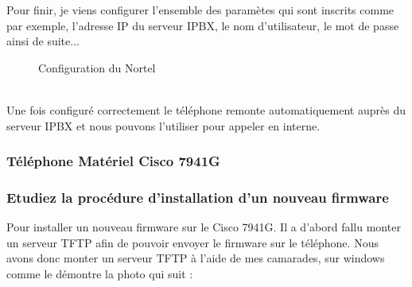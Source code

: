 \documentclass[12pt, a4paper]{article}
\begin{document}
	Pour finir, je viens configurer l'ensemble des paramètes qui sont inscrits
	comme par exemple, l'adresse IP du serveur IPBX, le nom d'utilisateur,
	le mot de passe ainsi de suite...\\
	\begin{figure}[h]
		\centering
		\caption{Configuration du Nortel}
		\label{fig:set}
	\end{figure}\\
	Une fois configuré correctement le téléphone remonte automatiquement auprès
	du serveur IPBX et nous pouvons l'utiliser pour appeler en interne. 


	\subsubsection{Téléphone Matériel Cisco 7941G}
	\subsubsection*{Etudiez la procédure d'installation d'un nouveau firmware}
	Pour installer un nouveau firmware sur le Cisco 7941G. Il a d'abord fallu 
	monter un serveur TFTP afin de pouvoir envoyer le firmware sur le téléphone.
	Nous avons donc monter un serveur TFTP à l'aide de mes camarades, sur windows comme
	le démontre la photo qui suit : 
	
\end{document}

